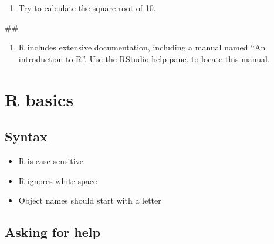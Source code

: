 \documentclass[]{book}
\newenvironment{Shaded}{\begin{snugshade}}{\end{snugshade}}
\newcommand{\NormalTok}[1]{#1}
\providecommand{\tightlist}{%
  \setlength{\itemsep}{0pt}\setlength{\parskip}{0pt}}
\begin{document}
\begin{enumerate}
\def\labelenumi{\arabic{enumi}.}
\setcounter{enumi}{1}
\tightlist
\item
  Try to calculate the square root of 10.
\end{enumerate}

\begin{Shaded}
\begin{Highlighting}[]
\NormalTok{##}
\end{Highlighting}
\end{Shaded}

\begin{enumerate}
\def\labelenumi{\arabic{enumi}.}
\setcounter{enumi}{2}
\tightlist
\item
  R includes extensive documentation, including a manual named ``An
  introduction to R''. Use the RStudio help pane. to locate this manual.
\end{enumerate}

\section{R basics}\label{r-basics}

\subsection{Syntax}\label{syntax}

\begin{itemize}
\tightlist
\item
  R is case sensitive
\item
  R ignores white space
\item
  Object names should start with a letter
\end{itemize}

\subsection{Asking for help}\label{asking-for-help}
\end{document}
